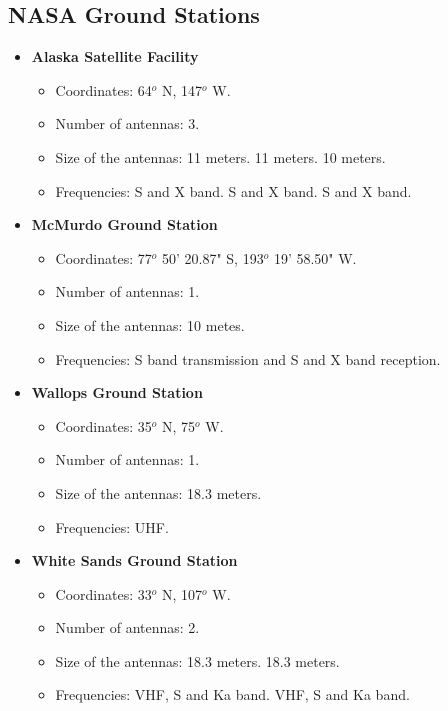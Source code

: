 \subsection{NASA Ground Stations}
\begin{itemize}
\item \textbf{Alaska Satellite Facility}
\begin{itemize}
\item Coordinates: 64$^{o}$ N, 147$^{o}$ W.
\item Number of antennas: 3.
\item Size of the antennas: 11 meters. 11 meters. 10 meters.
\item Frequencies: S and X band. S and X band. S and X band.
\end{itemize}
\item \textbf{McMurdo Ground Station}
\begin{itemize}
\item Coordinates: 77$^{o}$ 50' 20.87" S, 193$^{o}$ 19' 58.50" W.
\item Number of antennas: 1.
\item Size of the antennas: 10 metes.
\item Frequencies: S band transmission and S and X band reception.
\end{itemize}
\item \textbf{Wallops Ground Station}
\begin{itemize}
\item Coordinates: 35$^{o}$ N, 75$^{o}$ W.
\item Number of antennas: 1.
\item Size of the antennas: 18.3 meters.
\item Frequencies: UHF.
\end{itemize}
\item \textbf{White Sands Ground Station}
\begin{itemize}
\item Coordinates: 33$^{o}$ N, 107$^{o}$ W.
\item Number of antennas: 2.
\item Size of the antennas: 18.3 meters. 18.3 meters.
\item Frequencies: VHF, S and Ka band. VHF, S and Ka band.
\end{itemize}
\end{itemize}
